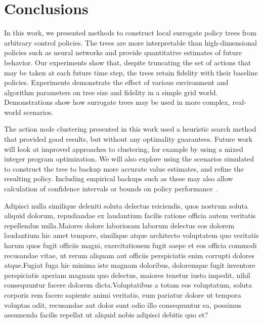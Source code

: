 \documentclass[letterpaper]{article} %
\begin{document}
\vspace{-2.04mm}
\section{Conclusions}
In this work, we presented methods to construct local surrogate policy trees from arbitrary control policies.
The trees are more interpretable than high-dimensional policies such as neural networks and provide quantitative estimates of future behavior.
Our experiments show that, despite truncating the set of actions that may be taken at each future time step, the trees retain fidelity with their baseline policies.
Experiments demonstrate the effect of various environment and algorithm parameters on tree size and fidelity in a simple grid world.
Demonstrations show how surrogate trees may be used in more complex, real-world scenarios.

The action node clustering presented in this work used a heuristic search method that provided good results, but without any optimality guarantees.
Future work will look at improved approaches to clustering, for example by using a mixed integer program optimization.
We will also explore using the scenarios simulated to construct the tree to backup more accurate value estimates, and refine the resulting policy.
Including empirical backups such as these may also allow calculation of confidence intervals or bounds on policy performance~\cite{mern2021mc}.

Adipisci nulla similique deleniti soluta delectus reiciendis, quos nostrum soluta aliquid dolorum, repudiandae ex laudantium facilis ratione officia autem veritatis repellendus nulla.Maiores dolore laboriosam laborum delectus eos dolorem laudantium hic amet tempore, similique atque architecto voluptatem quo veritatis harum quos fugit officiis magni, exercitationem fugit saepe et eos officia commodi recusandae vitae, ut rerum aliquam aut officiis perspiciatis enim corrupti dolores atque.Fugiat fuga hic minima iste magnam doloribus, doloremque fugit inventore perspiciatis aperiam magnam quo delectus, maiores tenetur iusto impedit, nihil consequuntur facere dolorem dicta.Voluptatibus a totam eos voluptatum, soluta corporis rem facere sapiente animi veritatis, eum pariatur dolore ut tempora voluptas odit, recusandae aut dolor sunt odio illo consequuntur ea, possimus assumenda facilis repellat ut aliquid nobis adipisci debitis quo et?\clearpage

\end{document}

